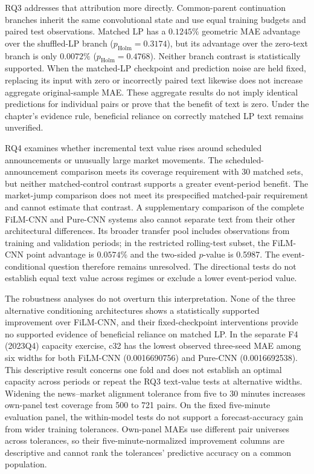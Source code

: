 RQ3 addresses that attribution more directly. Common-parent continuation
branches inherit the same convolutional state and use equal training budgets
and paired test observations. Matched LP has a $0.1245\%$ geometric MAE
advantage over the shuffled-LP branch ($p_{\mathrm{Holm}}=0.3174$), but its
advantage over the zero-text branch is only $0.0072\%$
($p_{\mathrm{Holm}}=0.4768$). Neither branch contrast is statistically
supported. When the matched-LP checkpoint and prediction noise are held
fixed, replacing its input with zero or incorrectly paired text likewise
does not increase aggregate original-sample MAE. These aggregate results do
not imply identical predictions for individual pairs or prove that the
benefit of text is zero. Under the chapter's evidence rule, beneficial
reliance on correctly matched LP text remains unverified.

RQ4 examines whether incremental text value rises around scheduled
announcements or unusually large market movements. The scheduled-announcement
comparison meets its coverage requirement with 30 matched sets, but neither
matched-control contrast supports a greater event-period benefit. The
market-jump comparison does not meet its prespecified matched-pair requirement
and cannot estimate that contrast. A supplementary comparison of the complete
FiLM-CNN and Pure-CNN systems also cannot separate text from their other
architectural differences. Its broader transfer pool includes observations
from training and validation periods; in the restricted rolling-test subset,
the FiLM-CNN point advantage is $0.0574\%$ and the two-sided $p$-value is
0.5987. The
event-conditional question therefore remains unresolved. The directional
tests do not establish equal text value across regimes or exclude a lower
event-period value.

The robustness analyses do not overturn this interpretation. None of the
three alternative conditioning architectures shows a statistically supported
improvement over FiLM-CNN, and their fixed-checkpoint interventions provide
no supported evidence of beneficial reliance on matched LP. In the separate
F4 (2023Q4) capacity exercise, c32 has the lowest observed three-seed MAE
among six widths for both FiLM-CNN (0.0016690756) and Pure-CNN
(0.0016692538). This descriptive result concerns one fold and does not
establish an optimal capacity across periods or repeat the RQ3 text-value
tests at alternative widths. Widening the news--market alignment tolerance
from five to 30 minutes increases own-panel test coverage from 500 to 721
pairs. On the fixed five-minute evaluation panel, the within-model tests do
not support a forecast-accuracy gain from wider training tolerances.
Own-panel MAEs use different pair universes across tolerances, so their
five-minute-normalized improvement columns are descriptive and cannot rank
the tolerances' predictive accuracy on a common population.

